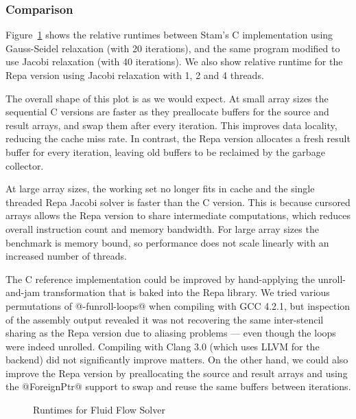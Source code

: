 \subsubsection{Comparison}
Figure~\ref{figure:FluidRuntime} shows the relative runtimes between Stam's C implementation using Gauss-Seidel relaxation (with 20 iterations), and the same program modified to use Jacobi relaxation (with 40 iterations). We also show relative runtime for the Repa version using Jacobi relaxation with 1, 2 and 4 threads. 

The overall shape of this plot is as we would expect. At small array sizes the sequential C versions are faster as they preallocate buffers for the source and result arrays, and swap them after every iteration. This improves data locality, reducing the cache miss rate. In contrast, the Repa version allocates a fresh result buffer for every iteration, leaving old buffers to be reclaimed by the garbage collector. 

At large array sizes, the working set no longer fits in cache and the single threaded Repa Jacobi solver is faster than the C version. This is because cursored arrays allows the Repa version to share intermediate computations, which reduces overall instruction count and memory bandwidth. For large array sizes the benchmark is memory bound, so performance does not scale linearly with an increased number of threads. 

The C reference implementation could be improved by hand-applying the unroll-and-jam transformation that is baked into the Repa library. We tried various permutations of @-funroll-loops@ when compiling with GCC 4.2.1, but inspection of the assembly output revealed it was not recovering the same inter-stencil sharing as the Repa version due to aliasing problems --- even though the loops were indeed unrolled. Compiling with Clang 3.0 (which uses LLVM for the backend) did not significantly improve matters. On the other hand, we could also improve the Repa version by preallocating the source and result arrays and using the @ForeignPtr@ support to swap and reuse the same buffers between iterations.


\begin{figure}

\caption{Runtimes for Fluid Flow Solver}
\label{figure:FluidRuntime}
\end{figure}


